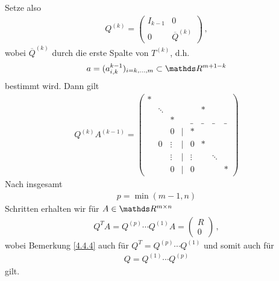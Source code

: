 \begin{Beme}
  Setze also
  \begin{gather}
    Q^{(k)} = \begin{pmatrix}
      I_{k-1} & 0 \\
      0 & \overline{Q}^{(k)}
      \label{IV.4.13}
    \end{pmatrix}\, ,
  \end{gather}
  wobei $\overline{Q}^{(k)} $ durch die erste Spalte von $T^{(k)}$, d.h.
  \begin{gather}
    a= (a_{i,k}^{k-1})_{i=k,\dotsc, m} \subset \R^{m+1-k}
    \label{IV.4.14}
  \end{gather}
  bestimmt wird. Dann gilt
  \begin{gather*}
    Q^{(k)}A^{(k-1)} =
    \begin{pmatrix}
      *  &&&&&\\
      &\ddots &&&& * \\
      &&*&&\_&\_&\_&\_ \\
      &&0&|&* \\
      &0&\vdots&|&0&* \\
      &&\vdots&  |&\vdots &&\ddots\\
      &&0&  |&0&&&*
    \end{pmatrix}
  \end{gather*}
  Nach insgesamt 
  \begin{gather}
    p=\min (m-1, n)
    \label{IV.4.15}
  \end{gather}
  Schritten erhalten wir für $A\in \R^{m\times n}$
  \begin{gather}
    Q^TA = Q^{(p)}\dotsm Q^{(1)}A 
    = \begin{pmatrix} R\\0\end{pmatrix}\, ,
  \end{gather}
  wobei Bemerkung \ref{4.4.4} auch für 
  $Q^T= Q^{(p)}\dotsm Q^{(1)} $ und somit auch für
  \begin{gather}
    Q = Q^{(1)}\dotsm Q^{(p)}
    \label{IV.4.16}
  \end{gather}
  gilt.
\end{Beme}




